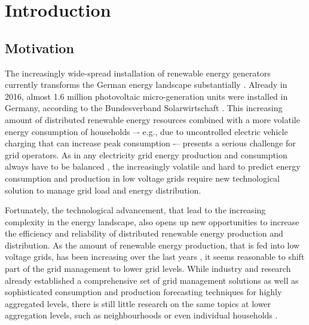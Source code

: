 
\section{Introduction}\label{Sec:Intro}




\subsection{Motivation}\label{Sec:Intro;Subsec:Motivation}

The increasingly wide-spread installation of renewable energy generators currently transforms the German energy landscape substantially \citep{Bayer:2018}. Already in 2016, almost 1.6 million photovoltaic micro-generation units were installed in Germany, according to the Bundesverband Solarwirtschaft \citep{BSW-Solar:2017}. This increasing amount of distributed renewable energy resources combined with a more volatile energy consumption of households –- e.g., due to uncontrolled electric vehicle charging that can increase peak consumption \citep{Fitzgerald:2016,Floch:2017} -– presents a serious challenge for grid operators. As in any electricity grid energy production and consumption always have to be balanced \citep{Weron:2006}, the increasingly volatile and hard to predict energy consumption and production in low voltage grids require new technological solution to manage grid load and energy distribution.

Fortunately, the technological advancement, that lead to the increasing complexity in the energy landscape, also opens up new opportunities to increase the efficiency and reliability of distributed renewable energy production and distribution. As the amount of renewable energy production, that is fed into low voltage grids, has been increasing over the last years \citep{Bayer:2018}, it seems reasonable to shift part of the grid management to lower grid levels. While industry and research already established a comprehensive set of grid management solutions as well as sophisticated consumption and production forecasting techniques for highly aggregated levels, there is still little research on the same topics at lower aggregation levels, such as neighbourhoods or even individual households \citep{Meer:2018}.

